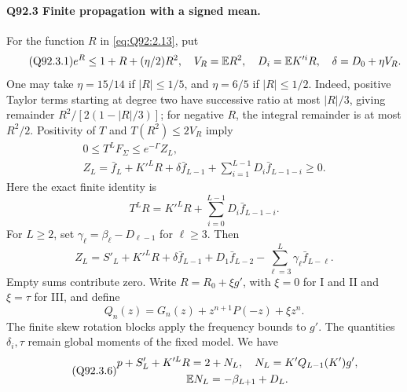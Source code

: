 \paragraph{Q92.3 Finite propagation with a signed mean.}
For the function \(R\) in \eqref{eq:Q92:2.13}, put
\begin{equation}\tag{Q92.3.1}\label{eq:Q92:3.1}
e^R\le1+R+(\eta/2)R^2,\quad
V_R=\mathbb E R^2,\quad D_i=\mathbb E K'^iR,\quad\delta=D_0+\eta V_R.
\end{equation}
One may take \(\eta=\allowbreak 15/14\) if \(|R|\le\allowbreak 1/5\), and \(\eta=\allowbreak 6/5\) if
\(|R|\le\allowbreak 1/2\). Indeed, positive Taylor terms starting at degree two
have successive ratio at most \(|R|/3\), giving remainder
\(R^2/[2(1-|R|/3)]\); for negative \(R\), the integral remainder is
at most \(R^2/2\). Positivity of \(T\) and \(T(R^2)\le\allowbreak 2V_R\) imply
\begin{equation}\tag{Q92.3.2}\label{eq:Q92:3.2}
\begin{gathered}
0\le T^LF_\Sigma\le e^{-\Gamma}Z_L,\\
Z_L=\bar f_L+K'^LR+\delta\bar f_{L-1}
+\sum_{i=1}^{L-1}D_i\bar f_{L-1-i}\ge0.
\end{gathered}
\end{equation}
Here the exact finite identity is
\begin{equation}\tag{Q92.3.3}\label{eq:Q92:3.3}
T^LR=K'^LR+\sum_{i=0}^{L-1}D_i\bar f_{L-1-i}.
\end{equation}
For \(L\ge\allowbreak 2\), set \(\gamma_\ell=\allowbreak \beta_\ell-D_{\ell-1}\) for
\(\ell\ge\allowbreak 3\). Then
\begin{equation}\tag{Q92.3.4}\label{eq:Q92:3.4}
Z_L=S'_L+K'^LR+\delta\bar f_{L-1}+D_1\bar f_{L-2}
-\sum_{\ell=3}^L\gamma_\ell\bar f_{L-\ell}.
\end{equation}
Empty sums contribute zero. Write \(R=\allowbreak R_0+\xi g'\), with \(\xi=\allowbreak 0\)
for I and II and \(\xi=\allowbreak \tau\) for III, and define
\begin{equation}\tag{Q92.3.5}\label{eq:Q92:3.5}
Q_n(z)=G_n(z)+z^{n+1}P(-z)+\xi z^n.
\end{equation}
The finite skew rotation blocks apply the frequency bounds to \(g'\).
The quantities \(\delta_i,\allowbreak \tau\) remain global moments of the fixed model.
We have
\begin{equation}\tag{Q92.3.6}\label{eq:Q92:3.6}
\begin{gathered}
p+S'_L+K'^LR=2+N_L,\quad N_L=K'Q_{L-1}(K')g',\\
\mathbb E N_L=-\beta_{L+1}+D_L.
\end{gathered}
\end{equation}
